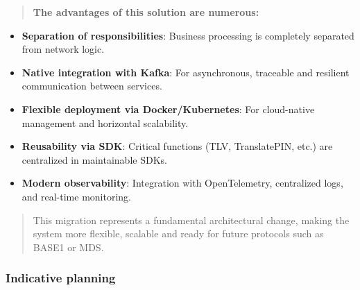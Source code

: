 \documentclass[12pt,a4paper]{report}
\begin{document}
\begin{quote}
\textbf{The advantages of this solution are numerous:}
\end{quote}

\begin{itemize}
\item
  \textbf{Separation of responsibilities}: Business processing is
  completely separated from network logic.
\item
  \textbf{Native integration with Kafka}: For asynchronous, traceable
  and resilient communication between services.
\item
  \textbf{Flexible deployment via Docker/Kubernetes}: For cloud-native
  management and horizontal scalability.
\item
  \textbf{Reusability via SDK}: Critical functions (TLV, TranslatePIN,
  etc.) are centralized in maintainable SDKs.
\item
  \textbf{Modern observability}: Integration with OpenTelemetry,
  centralized logs, and real-time monitoring.
\end{itemize}

\begin{quote}
This migration represents a fundamental architectural change, making the
system more flexible, scalable and ready for future protocols such as
BASE1 or MDS.
\end{quote}

\hypertarget{indicative-planning}{%
\subsubsection{\texorpdfstring{\textbf{Indicative
planning}}{Indicative planning}}\label{indicative-planning}}
\end{document}
